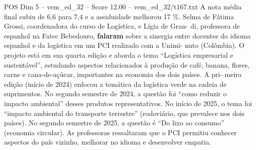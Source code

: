 \begin{textsample}{POS Dim 5 – vem\_ed\_32 – Score 12.00 – vem\_ed\_32/t167.txt}
A nota média final subiu de 6,6 para 7,4 e a assiduidade melhorou 17 \%.
Selma de Fátima Grossi, coordenadora do curso de Logística, e Lígia de Gran- di, professora de espanhol na Fatec Bebedouro, \textbf{falaram} sobre a sinergia entre docentes do idioma espanhol e da logística em um PCI realizado com a Unimi- nuto (Colômbia).
O projeto está em sua quarta edição e aborda o tema “Logística empresarial e sustentável”, estudando aspectos relacionados à produção de café, banana, flores, carne e cana-de-açúcar, importantes na economia dos dois países.
A pri- meira edição (início de 2024) enfocou a temática da logística verde na cadeia de suprimentos.
No segundo semestre de 2024, a questão foi “como reduzir o impacto ambiental” desses produtos representativos.
No início de 2025, o tema foi “impacto ambiental do transporte terrestre” (rodoviário, que prevalece nos dois países).
No segundo semestre de 2025, a questão é “Do lixo ao consumo” (economia circular).
As professoras ressaltaram que o PCI permitiu conhecer aspectos do país vizinho, melhorar no idioma e desenvolver empatia.

\end{textsample}
